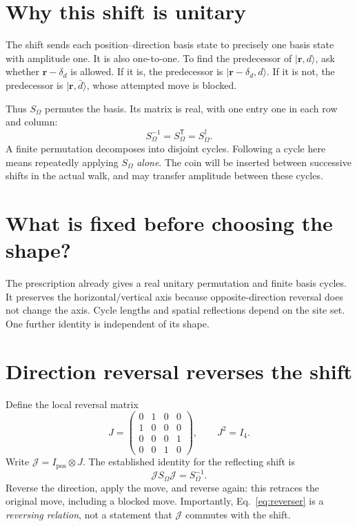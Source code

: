 \documentclass[11pt,a4paper,oneside]{report}
\newcommand{\ket}[1]{\lvert #1\rangle}
\newcommand{\Id}{I}
\numberwithin{equation}{chapter}
\begin{document}
\section{Why this shift is unitary}

The shift sends each position--direction basis state to precisely one
basis state with amplitude one. It is also one-to-one. To find the
predecessor of \(\ket{\mathbf r,d}\), ask whether
\(\mathbf r-\delta_d\) is allowed. If it is, the predecessor is
\(\ket{\mathbf r-\delta_d,d}\). If it is not, the predecessor is
\(\ket{\mathbf r,\bar d}\), whose attempted move is blocked.

Thus \(S_\Omega\) permutes the basis. Its matrix is real, with one
entry one in each row and column:
\begin{equation}
\boxed{S_\Omega^{-1}=S_\Omega^{\mathsf T}=S_\Omega^\dagger.}
\end{equation}
A finite permutation decomposes into disjoint cycles. Following a cycle
here means repeatedly applying \(S_\Omega\) \emph{alone}. The coin
will be inserted between successive shifts in the actual walk, and
may transfer amplitude between these cycles.

\section{What is fixed before choosing the shape?}

The prescription already gives a real unitary permutation and finite
basis cycles. It preserves the horizontal/vertical axis because
opposite-direction reversal does not change the axis. Cycle lengths
and spatial reflections depend on the site set. One further identity
is independent of its shape.

\section{Direction reversal reverses the shift}

Define the local reversal matrix
\begin{equation}
J=
\begin{pmatrix}
0&1&0&0\\1&0&0&0\\0&0&0&1\\0&0&1&0
\end{pmatrix},\qquad J^2=\Id_4.
\end{equation}
Write \(\mathcal J=\Id_{\mathrm{pos}}\otimes J\). The established
identity for the reflecting shift is
\begin{equation}
\boxed{\mathcal J S_\Omega\mathcal J=S_\Omega^{-1}.}
\label{eq:reverser}
\end{equation}
Reverse the direction, apply the move, and reverse again: this retraces
the original move, including a blocked move. Importantly,
Eq.~\eqref{eq:reverser} is a \emph{reversing relation}, not a statement
that \(\mathcal J\) commutes with the shift.
\end{document}
